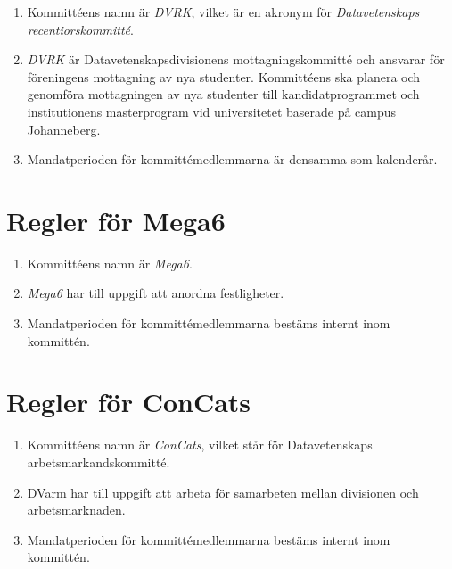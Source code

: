\documentclass{dvd}
\begin{document}
	\begin{enumerate}[label=\arabic* §, ref=\arabic*]
		\item Kommittéens namn är \emph{DVRK}, vilket är en akronym för \emph{Datavetenskaps recentiorskommitté}.

		\item \emph{DVRK} är Datavetenskapsdivisionens mottagningskommitté och ansvarar för föreningens mottagning av nya studenter.
		Kommittéens ska planera och genomföra mottagningen av nya studenter till kandidatprogrammet och institutionens masterprogram vid universitetet baserade på campus Johanneberg.

		\item Mandatperioden för kommittémedlemmarna är densamma som kalenderår.

	\end{enumerate}

\section{Regler för Mega6}

	\begin{enumerate}[label=\arabic* §, ref=\arabic*]
		\item Kommittéens namn är \emph{Mega6}.

		\item \emph{Mega6} har till uppgift att anordna festligheter.

		\item Mandatperioden för kommittémedlemmarna bestäms internt inom kommittén.

	\end{enumerate}

\section{Regler för ConCats}

	\begin{enumerate}[label=\arabic* §, ref=\arabic*]
		\item Kommittéens namn är \emph{ConCats}, vilket står för Datavetenskaps arbetsmarkandskommitté.

		\item DVarm har till uppgift att arbeta för samarbeten mellan divisionen och arbetsmarknaden.

		\item Mandatperioden för kommittémedlemmarna bestäms internt inom kommittén.

	\end{enumerate}
\end{document}
